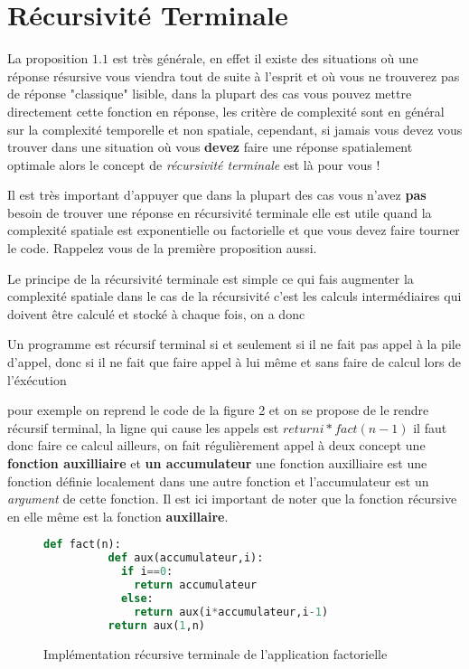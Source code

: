\documentclass[hidelinks]{article}
\begin{document}
    \section{Récursivité Terminale}
    La proposition $1.1$ est très générale, en effet il existe des situations où une réponse résursive vous viendra tout de suite à l'esprit
    et où vous ne trouverez pas de réponse "classique" lisible, dans la plupart des cas vous pouvez mettre directement cette fonction 
    en réponse, les critère de complexité sont en général sur la complexité temporelle et non spatiale, cependant, si jamais vous devez 
    vous trouver dans une situation où vous \textbf{devez} faire une réponse spatialement optimale alors le concept de 
    \textit{récursivité terminale} est là pour vous !
    \begin{rmq}
        Il est très important d'appuyer que dans la plupart des cas vous n'avez \textbf{pas} besoin de trouver une réponse en récursivité terminale 
        elle est utile quand la complexité spatiale est exponentielle ou factorielle et que vous devez faire tourner le code. Rappelez vous de la première proposition 
        aussi.
    \end{rmq}
    Le principe de la récursivité terminale est simple ce qui fais augmenter la complexité spatiale dans le cas de la récursivité 
    c'est les calculs intermédiaires qui doivent être calculé et stocké à chaque fois, on a donc 
    \begin{definition}
        Un programme est récursif terminal si et seulement si il ne fait pas appel à la pile d'appel, donc si il ne fait que faire 
        appel à lui même et sans faire de calcul lors de l'éxécution
    \end{definition}
    pour exemple on reprend le code de la figure 2 et on se propose de le rendre récursif terminal,
    la ligne qui cause les appels est $return i*fact(n-1)$ il faut donc faire ce calcul ailleurs, on fait régulièrement appel à deux concept 
    une \textbf{fonction auxilliaire} et \textbf{un accumulateur} une fonction auxilliaire est une fonction définie localement dans une autre fonction 
    et l'accumulateur est un \textit{argument} de cette fonction. Il est ici important de noter que la fonction récursive en elle même est la 
    fonction \textbf{auxillaire}.
    \begin{figure}[H]
        \begin{lstlisting}[language=Python]
        def fact(n):
          def aux(accumulateur,i):
            if i==0:
              return accumulateur
            else:
              return aux(i*accumulateur,i-1)
          return aux(1,n)
        \end{lstlisting}
        \caption{Implémentation récursive terminale de l'application factorielle}
    \end{figure}
\end{document}
